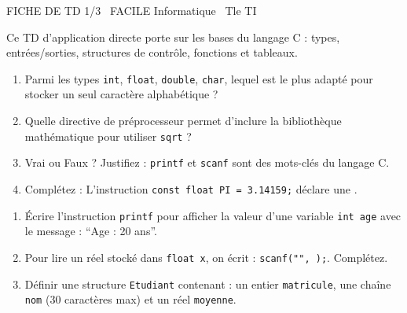 \documentclass[11pt]{article}
\begin{document}
\begin{tcolorbox}[enhanced,colback=popink,colframe=popink,arc=10pt,boxrule=0pt,left=12pt,right=12pt,top=9pt,bottom=9pt]
{\color{white}\popxbold\small FICHE DE TD 1/3 \textbullet\ FACILE \hfill Informatique \textbullet\ Tle TI\par}
\end{tcolorbox}
\vspace{4pt}
\noindent Ce TD d'application directe porte sur les bases du langage C : types, entrées/sorties, structures de contrôle, fonctions et tableaux.

\begin{exercice}
\begin{enumerate}
    \item Parmi les types \texttt{int}, \texttt{float}, \texttt{double}, \texttt{char}, lequel est le plus adapté pour stocker un seul caractère alphabétique ?
    \item Quelle directive de préprocesseur permet d'inclure la bibliothèque mathématique pour utiliser \texttt{sqrt} ?
    \item Vrai ou Faux ? Justifiez : \texttt{printf} et \texttt{scanf} sont des mots-clés du langage C.
    \item Complétez : L'instruction \texttt{const float PI = 3.14159;} déclare une \underline{\hspace{3cm}}.
\end{enumerate}
\end{exercice}

\begin{exercice}
\begin{enumerate}
    \item Écrire l'instruction \texttt{printf} pour afficher la valeur d'une variable \texttt{int age} avec le message : ``Age : 20 ans''.
    \item Pour lire un réel stocké dans \texttt{float x}, on écrit : \texttt{scanf("\underline{\hspace{2cm}}", \underline{\hspace{2cm}});}. Complétez.
    \item Définir une structure \texttt{Etudiant} contenant : un entier \texttt{matricule}, une chaîne \texttt{nom} (30 caractères max) et un réel \texttt{moyenne}.
\end{enumerate}
\end{exercice}
\end{document}
